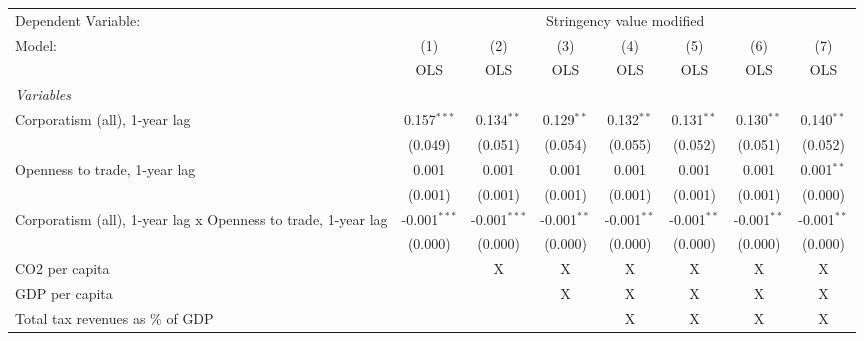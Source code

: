 
\begingroup
\centering
\begin{tabular}{lccccccc}
   \toprule
   Dependent Variable: & \multicolumn{7}{c}{Stringency value modified}\\
   Model:                                                        & (1)            & (2)            & (3)           & (4)           & (5)           & (6)           & (7)\\  
                                                                 &  OLS           & OLS            & OLS           & OLS           & OLS           & OLS           & OLS\\  
   \midrule
   \emph{Variables}\\
   Corporatism (all), 1-year lag                                 & 0.157$^{***}$  & 0.134$^{**}$   & 0.129$^{**}$  & 0.132$^{**}$  & 0.131$^{**}$  & 0.130$^{**}$  & 0.140$^{**}$\\   
                                                                 & (0.049)        & (0.051)        & (0.054)       & (0.055)       & (0.052)       & (0.051)       & (0.052)\\   
   Openness to trade, 1-year lag                                 & 0.001          & 0.001          & 0.001         & 0.001         & 0.001         & 0.001         & 0.001$^{**}$\\   
                                                                 & (0.001)        & (0.001)        & (0.001)       & (0.001)       & (0.001)       & (0.001)       & (0.000)\\   
   Corporatism (all), 1-year lag x Openness to trade, 1-year lag & -0.001$^{***}$ & -0.001$^{***}$ & -0.001$^{**}$ & -0.001$^{**}$ & -0.001$^{**}$ & -0.001$^{**}$ & -0.001$^{**}$\\   
                                                                 & (0.000)        & (0.000)        & (0.000)       & (0.000)       & (0.000)       & (0.000)       & (0.000)\\   
   CO2 per capita                                                &                & X              & X             & X             & X             & X             & X\\  
   GDP per capita                                                &                &                & X             & X             & X             & X             & X\\  
   Total tax revenues as \% of GDP                               &                &                &               & X             & X             & X             & X\\  

\end{tabular}
